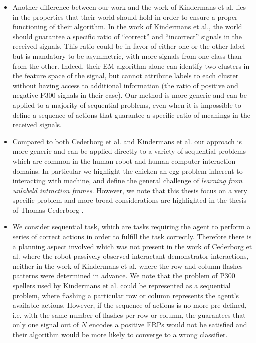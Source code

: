 \begin{itemize}
\item Another difference between our work and the work of Kindermans et al. lies in the properties that their world should hold in order to ensure a proper functioning of their algorithm. In the work of Kindermans et al., the world should guarantee a specific ratio of ``correct'' and ``incorrect'' signals in the received signals. This ratio could be in favor of either one or the other label but is mandatory to be asymmetric, with more signals from one class than from the other. Indeed, their EM algorithm alone can identify two clusters in the feature space of the signal, but cannot attribute labels to each cluster without having access to additional information (the ratio of positive and negative P300 signals in their case). Our method is more generic and can be applied to a majority of sequential problems, even when it is impossible to define a sequence of actions that guarantee a specific ratio of meanings in the received signals. 


\item Compared to both Cederborg et al. and Kindermans et al. our approach is more generic and can be applied directly to a variety of sequential problems which are common in the human-robot and human-computer interaction domains. In particular we highlight the chicken an egg problem inherent to interacting with machine, and define the general challenge of \emph{learning from unlabeld intraction frames}. However, we note that this thesis focus on a very specific problem and more broad considerations are highlighted in the thesis of Thomas Cederborg \cite{cederborg2014thesis}.

\item We consider sequential task, which are tasks requiring the agent to perform a series of correct actions in order to fulfill the task correctly. Therefore there is a planning aspect involved which was not present in the work of Cederborg et al. where the robot passively observed interactant-demonstrator interactions, neither in the work of Kindermans et al. where the row and column flashes patterns were determined in advance. We note that the problem of P300 spellers used by Kindermans et al. could be represented as a sequential problem, where flashing a particular row or column represents the agent's available actions. However, if the sequence of actions is no more pre-defined, i.e. with the same number of flashes per row or column, the guarantees that only one signal out of $N$ encodes a positive ERPs would not be satisfied and their algorithm would be more likely to converge to a wrong classifier.


\end{itemize}
